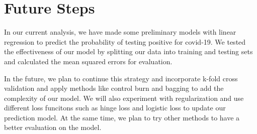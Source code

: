 \documentclass[10pt, a4paper, twocolumn]{article} %
\begin{document}
 
 \section{Future Steps}
 In our current analysis, we have made some preliminary models with linear regression to predict the probability of testing positive for covid-19. We tested the effectiveness of our model by splitting our data into training and testing sets and calculated the mean squared errors for evaluation.
 
 \vspace{12pt} %
 
In the future, we plan to continue this strategy and incorporate k-fold cross validation and apply methods like control burn and bagging to add the complexity of our model. We will also experiment with regularization and use different loss funcitons such as hinge loss and logistic loss to update our prediction model. At the same time, we plan to try other methods to have a better evaluation on the model.
\end{document}
